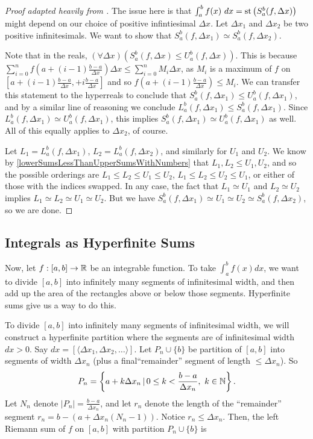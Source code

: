 \begin{proof}[Proof adapted heavily from ]
    The issue here is that $\int_a^b f(x)\ dx = \operatorname{st}\left(S_a^b(f, \Delta x)\right)$ might depend on our choice of positive infintiesimal $\Delta x$. Let $\Delta x_1$ and $\Delta x_2$ be two positive infinitesimals. We want to show that $S_a^b(f, \Delta x_1) \simeq S_a^b(f, \Delta x_2)$.

    Note that in the reals, $(\forall \Delta x)(S_a^b(f, \Delta x) \leq U_a^b(f, \Delta x))$. This is because $\sum_{i=0}^n f(a + (i-1)\frac{b-a}{\Delta x})\Delta x \leq \sum_{i=0}^n M_i \Delta x$, as $M_i$ is a maximum of $f$ on $[a + (i-1)\frac{b-a}{\Delta x},  + i\frac{b-a}{\Delta x}]$ and so $f(a + (i-1)\frac{b-a}{\Delta x}) \leq M_i$. We can transfer this statement to the hyperreals to conclude that $S_a^b(f, \Delta x_1) \leq U_a^b(f, \Delta x_1)$, and by a similar line of reasoning we conclude $L_a^b(f, \Delta x_1) \leq S_a^b(f, \Delta x_1)$. Since $L_a^b(f, \Delta x_1) \simeq U_a^b(f, \Delta x_1)$, this implies $S_a^b(f, \Delta x_1) \simeq U_a^b(f, \Delta x_1)$ as well. All of this equally applies to $\Delta x_2$, of course.

    Let $L_1 = L_a^b(f, \Delta x_1)$, $L_2 = L_a^b(f, \Delta x_2)$, and similarly for $U_1$ and $U_2$. We know by \autoref{lowerSumsLessThanUpperSumsWithNumbers} that $L_1, L_2 \leq U_1, U_2$, and so the possible orderings are $L_1 \leq L_2 \leq U_1 \leq U_2$, $L_1 \leq L_2 \leq U_2 \leq U_1$, or either of those with the indices swapped. In any case, the fact that $L_1 \simeq U_1$ and $L_2 \simeq U_2$ implies $L_1 \simeq L_2 \simeq U_1 \simeq U_2$. But we have $S_a^b(f, \Delta x_1) \simeq U_1 \simeq U_2 \simeq S_a^b(f, \Delta x_2)$, so we are done.
\end{proof}

\subsection{Integrals as Hyperfinite Sums}
Now, let $f: [a, b] \to \mathbb{R}$ be an integrable function. To take $\int_a^b f(x)dx$, we want to divide $[a, b]$ into infinitely many segments of infinitesimal width, and then add up the area of the rectangles above or below those segments. Hyperfinite sums give us a way to do this.

To divide $[a, b]$ into infinitely many segments of infinitesimal width, we will construct a hyperfinite partition where the segments are of infinitesimal width $dx > 0$. Say $dx = [\langle \Delta x_1, \Delta x_2, \ldots \rangle]$. Let $P_n \cup \{b\}$ be partition of $[a, b]$ into segments of width $\Delta x_n$ (plus a final``remainder'' segment of length $\leq \Delta x_n$). So
\[
P_n = \left\{a + k\Delta x_n \,|\, 0 \leq k < \frac{b-a}{\Delta x_n},\ k \in \mathbb{N}\right\}.
\]
Let $N_n$ denote $|P_n| = \frac{b-a}{\Delta x_n}$, and let $r_n$ denote the length of the ``remainder'' segment $r_n = b - (a + \Delta x_n(N_n-1))$. Notice $r_n \leq \Delta x_n$. Then, the left Riemann sum of $f$ on $[a, b]$ with partition $P_n \cup \{b\}$ is 
